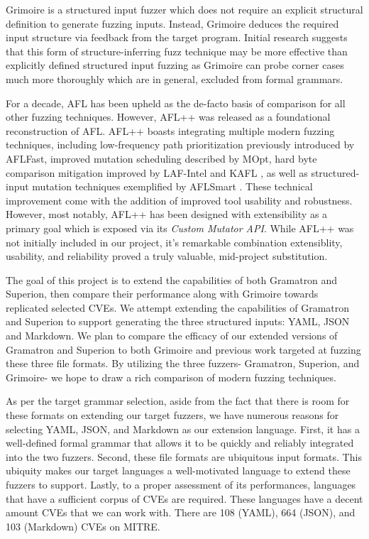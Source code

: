 \documentclass[12pt]{diazessay}
\begin{document}
Grimoire\cite{GRIMOIRE} is a structured input fuzzer which does not require an explicit structural definition to generate fuzzing inputs.
Instead, Grimoire deduces the required input structure via feedback from the target program.
Initial research suggests that this form of structure-inferring fuzz technique may be more effective than explicitly defined structured input fuzzing as Grimoire can probe corner cases much more thoroughly which are in general, excluded from formal grammars.

For a decade, AFL has been upheld as the de-facto basis of comparison for all other fuzzing techniques.
However, AFL++\cite{fioraldi2020afl++} was released as a foundational reconstruction of AFL.
AFL++ boasts integrating multiple modern fuzzing techniques, including low-frequency path prioritization previously introduced by AFLFast\cite{bohme2017coverage}, improved mutation scheduling described by MOpt\cite{lyu2019mopt}, hard byte comparison mitigation improved by LAF-Intel \cite{intel2016circumventing} and KAFL \cite{schumilo2017kafl}, as well as structured-input mutation techniques exemplified by AFLSmart \cite{pham2019smart}.
These technical improvement come with the addition of improved tool usability and robustness.
However, most notably, AFL++ has been designed with extensibility as a primary goal which is exposed via its \emph{Custom Mutator API}.
While AFL++ was not initially included in our project, it's remarkable combination extensiblity, usability, and reliability proved a truly valuable, mid-project substitution.

The goal of this project is to extend the capabilities of both Gramatron and 
Superion, then compare their performance along with Grimoire towards replicated selected CVEs.
We attempt extending the capabilities of Gramatron and Superion to support generating the three structured inputs: YAML\cite{YAMLdraft}, JSON and Markdown.
We plan to compare the efficacy of our extended versions of Gramatron and Superion to both Grimoire and previous work targeted at fuzzing these three file formats.
By utilizing the three fuzzers- Gramatron, Superion, and Grimoire- we hope to draw a rich comparison of modern fuzzing techniques.

As per the target grammar selection, aside from the fact that there is room for these formats on extending our target fuzzers, we have numerous reasons for selecting YAML, JSON, and Markdown as our extension language.
First, it has a well-defined formal grammar that allows it to be quickly and reliably integrated into the two fuzzers.
Second, these file formats are ubiquitous input formats.
This ubiquity makes our target languages a well-motivated language to extend these fuzzers to support.
Lastly, to a proper assessment of its performances, languages that have a sufficient corpus of CVEs are required. 
These languages have a decent amount CVEs that we can work with.
There are 108 (YAML), 664 (JSON), and 103 (Markdown) CVEs on MITRE\cite{MITRE}.
\end{document}

